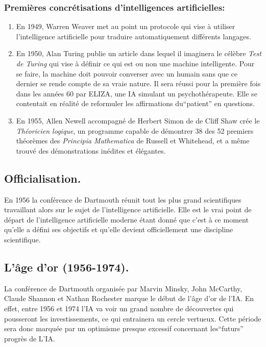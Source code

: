 \documentclass[a4paper, 12pt]{article}
\numberwithin{equation}{subsection}
\begin{document}
\subsubsection{Premières concrétisations d'intelligences artificielles:}
\begin{enumerate}
  \item En 1949, Warren Weaver met au point un protocole qui vise à utiliser l'intelligence artificielle pour traduire automatiquement différents langages.
  \item En 1950, Alan Turing publie un article dans lequel il imaginera le célèbre \textit{Test de Turing} qui vise à définir ce qui est ou non une machine intelligente. Pour se faire, la machine doit pouvoir converser avec un humain sans que ce dernier se rende compte de sa vraie nature. Il sera réussi pour la première fois dans les années 60 par ELIZA, une IA simulant un psychothérapeute. Elle se contentait en réalité de reformuler les affirmations du``patient'' en questions.
  \item En 1955, Allen Newell accompagné de Herbert Simon de de Cliff Shaw crée le \textit{Théoricien logique}, un programme capable de démontrer 38 des 52 premiers théorèmes des \textit{Principia Mathematica} de Russell et Whitehead, et a même trouvé des démonstrations inédites et élégantes.
\end{enumerate}
\subsection{Officialisation.}
En 1956 la conférence de Dartmouth réunit tout les plus grand scientifiques travaillant alors sur le sujet de l'intelligence artificielle. Elle est le vrai point de départ de l'intelligence artificielle moderne étant donné que c'est à ce moment qu'elle a défini ses objectifs et qu'elle devient officiellement une discipline scientifique.
\subsection{L'âge d'or (1956-1974).}
La conférence de Dartmouth organisée par Marvin Minsky, John McCarthy, Claude Shannon et Nathan Rochester marque le début de l'âge d'or de l'IA. En effet, entre 1956 et 1974 l'IA va voir un grand nombre de découvertes qui pousseront les investissements, ce qui entrainera un cercle vertueux. Cette période sera donc marquée par un optimisme presque excessif concernant les``futurs'' progrès de L'IA.\\
\end{document}
